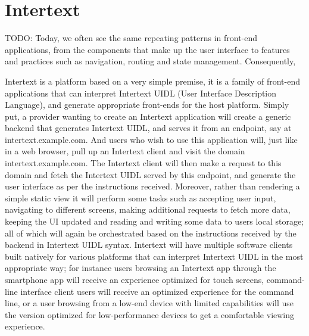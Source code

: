 
\chapter{Intertext}

TODO: 
Today, we often see the same repeating patterns in front-end applications, from the components that make up the user interface to features and practices such as navigation, routing and state management. Consequently, 

Intertext is a platform based on a very simple premise, it is a family of front-end applications that can interpret Intertext UIDL (User Interface Description Language), and generate appropriate front-ends for the host platform. Simply put, a provider wanting to create an Intertext application will create a generic backend that generates Intertext UIDL, and serves it from an endpoint, say at intertext.example.com. And users who wish to use this application will, just like in a web browser, pull up an Intertext client and visit the domain intertext.example.com. The Intertext client will then make a request to this domain and fetch the Intertext UIDL served by this endpoint, and generate the user interface as per the instructions received. Moreover, rather than rendering a simple static view it will perform some tasks such as accepting user input, navigating to different screens, making additional requests to fetch more data, keeping the UI updated and reading and writing some data to users local storage; all of which will again be orchestrated based on the instructions received by the backend in Intertext UIDL syntax. Intertext will have multiple software clients built natively for various platforms that can interpret Intertext UIDL in the most appropriate way; for instance users browsing an Intertext app through the smartphone app will receive an experience optimized for touch screens, command-line interface client users will receive an optimized experience for the command line, or a user browsing from a low-end device with limited capabilities will use the version optimized for low-performance devices to get a comfortable viewing experience. 


